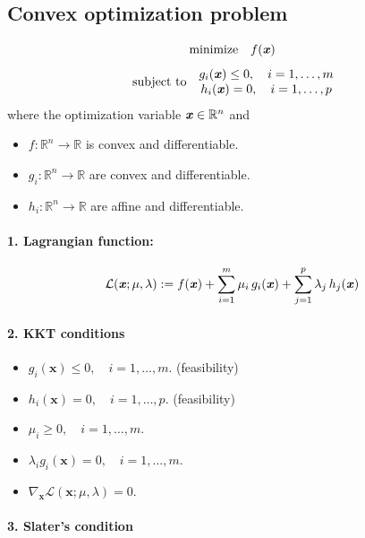 \documentclass[12pt]{book}
\theoremstyle{definition}
\theoremstyle{remark}
\newcommand{\R}{\mathbb{R}}
\begin{document}
\subsection{Convex optimization problem}
\[\text{minimize} \quad f(\textbf{\textit{x}})\]
\[\text{subject to} \quad \begin{matrix}g_i(\textbf{\textit{x}})\le 0, \quad i=1,\dots,m
 \\h_i(\textbf{\textit{x}})= 0, \quad i=1,\dots,p
\end{matrix}\]
where the optimization variable $\textbf{\textit{x}} \in \R^n$ and
\begin{itemize}
    \item $f : \mathbb{R}^n \to \mathbb{R}$ is convex and differentiable.
    \item $g_i : \mathbb{R}^n \to \mathbb{R}$ are convex and differentiable.
    \item $h_i : \mathbb{R}^n \to \mathbb{R}$ are affine and differentiable.
\end{itemize}

\paragraph{1. Lagrangian function:}
\[
\mathcal{L}(\textbf{\textit{x}}; \mu, \lambda):= f(\textbf{\textit{x}})+ \sum_{i=1}^m \mu_i\,g_i(\textbf{\textit{x}})+ \sum_{j=1}^p \lambda_j\,h_j(\textbf{\textit{x}})\]

\paragraph{2. KKT conditions}
\begin{itemize}
    \item $g_i(\mathbf{x}) \leq 0, \quad i = 1, \dots, m.$ \hfill (feasibility)
    \item $h_i(\mathbf{x}) = 0, \quad i = 1, \dots, p.$ \hfill (feasibility)
    \item $\mu_i \geq 0, \quad i = 1, \dots, m.$
    \item $\lambda_i g_i(\mathbf{x}) = 0, \quad i = 1, \dots, m.$
    \item $\nabla_{\mathbf{x}} \mathcal{L}(\mathbf{x}; \mu, \lambda) = 0.$
\end{itemize}

\paragraph{3. Slater's condition}
\end{document}
